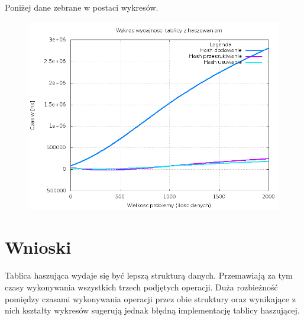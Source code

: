 \documentclass[a4paper,12pt]{article}
\begin{document}
Poniżej dane zebrane w postaci wykresów.

\begin{center}
	\begin{figure}[h]
		\includegraphics[scale = 0.4]{HSH_result.png}
	\end{figure}
\end{center}

\newpage

\section{Wnioski}

Tablica haszująca wydaje się być lepszą strukturą danych. Przemawiają za tym czasy wykonywania wszystkich trzech podjętych operacji. Duża rozbieżność pomiędzy czasami wykonywania operacji przez obie struktury oraz wynikające z nich kształty wykresów sugerują jednak błędną implementację tablicy haszującej. 
\end{document}
